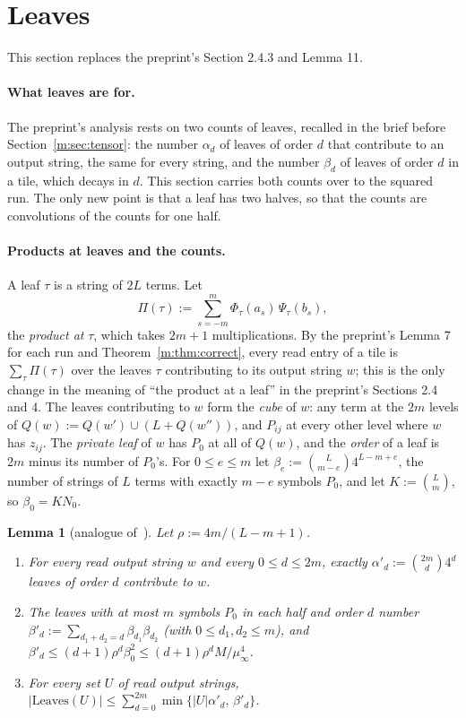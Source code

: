 \documentclass[11pt]{article}
\newtheorem{lemma}[theorem]{Lemma}
\theoremstyle{definition}
\theoremstyle{remark}
\newcommand{\Leaves}{\mathrm{Leaves}}
\newcommand{\Nz}{N_0}
\begin{document}
\section{Leaves}\label{m:sec:leaves}

This section replaces the preprint's Section 2.4.3 and Lemma 11.

\paragraph{What leaves are for.} The preprint's analysis rests on two counts of leaves, recalled in the brief before Section~\ref{m:sec:tensor}: the number $\alpha_d$ of leaves of order $d$ that contribute to an output string, the same for every string, and the number $\beta_d$ of leaves of order $d$ in a tile, which decays in $d$. This section carries both counts over to the squared run. The only new point is that a leaf has two halves, so that the counts are convolutions of the counts for one half.

\paragraph{Products at leaves and the counts.} A leaf $\tau$ is a string of $2L$ terms. Let
\[
\Pi(\tau):=\sum_{s=-m}^{m}\Phi_\tau(a_s)\,\Psi_\tau(b_s),
\]
the \emph{product at} $\tau$, which takes $2m+1$ multiplications. By the preprint's Lemma 7 for each run and Theorem~\ref{m:thm:correct}, every read entry of a tile is $\sum_{\tau}\Pi(\tau)$ over the leaves $\tau$ contributing to its output string $w$; this is the only change in the meaning of ``the product at a leaf'' in the preprint's Sections 2.4 and 4. The leaves contributing to $w$ form the \emph{cube} of $w$: any term at the $2m$ levels of $Q(w):=Q(w')\cup(L+Q(w''))$, and $P_{ij}$ at every other level where $w$ has $z_{ij}$. The \emph{private leaf} of $w$ has $P_0$ at all of $Q(w)$, and the \emph{order} of a leaf is $2m$ minus its number of $P_0$'s. For $0\le e\le m$ let $\beta_e:=\binom L{m-e}4^{L-m+e}$, the number of strings of $L$ terms with exactly $m-e$ symbols $P_0$, and let $K:=\binom Lm$, so $\beta_0=K\Nz$.

\begin{lemma}[analogue of~{\cite[Lemma 11]{ZT}}]\label{m:lem:counts}
Let $\rho:=4m/(L-m+1)$.
\begin{enumerate}[label=(\alph*),nosep]
\item For every read output string $w$ and every $0\le d\le2m$, exactly $\alpha'_d:=\binom{2m}d4^d$ leaves of order $d$ contribute to $w$.
\item The leaves with at most $m$ symbols $P_0$ in each half and order $d$ number $\beta'_d:=\sum_{d_1+d_2=d}\beta_{d_1}\beta_{d_2}$ (with $0\le d_1,d_2\le m$), and $\beta'_d\le(d+1)\rho^d\beta_0^2\le(d+1)\rho^dM/\mu_\infty^4$.
\item For every set $U$ of read output strings, $|\Leaves(U)|\le\sum_{d=0}^{2m}\min\{|U|\alpha'_d,\,\beta'_d\}$.
\end{enumerate}
\end{lemma}
\end{document}
